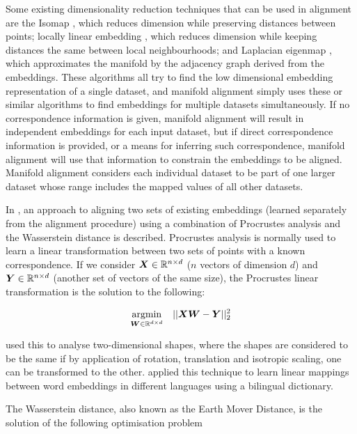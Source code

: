 Some existing dimensionality reduction techniques that can be used in alignment are the Isomap \cite{Isomap}, which reduces dimension while preserving distances between points; locally linear embedding \cite {LocallyLinearEmbedding}, which reduces dimension while keeping distances the same between local neighbourhoods; and Laplacian eigenmap \cite{LaplacianEigenmaps}, which approximates the manifold by the adjacency graph derived from the embeddings. These algorithms all try to find the low dimensional embedding representation of a single dataset, and manifold alignment simply uses these or similar algorithms to find embeddings for multiple datasets simultaneously. If no correspondence information is given, manifold alignment will result in independent embeddings for each input dataset, but if direct correspondence information is provided, or a means for inferring such correspondence, manifold alignment will use that information to constrain the embeddings to be aligned. Manifold alignment considers each individual dataset to be part of one larger dataset whose range includes the mapped values of all other datasets. 

In \cite{UnsupervisedAlignmentWP}, an approach to aligning two sets of existing embeddings (learned separately from the alignment procedure) using a combination of Procrustes analysis and the Wasserstein distance is described. Procrustes analysis is normally used to learn a linear transformation between two sets of points with a known correspondence. If we consider $\boldsymbol{X} \in \mathbb{R}^{n \times d}$ ($n$ vectors of dimension $d$) and $\boldsymbol{Y} \in \mathbb{R}^{n \times d}$ (another set of vectors of the same size), the Procrustes linear transformation is the solution to the following:

\begin{equation}
    \underset{\boldsymbol{W} \in \mathbb{R}^{d \times d}}{\operatorname{argmin}} \quad  ||\boldsymbol{X} \boldsymbol{W} - \boldsymbol{Y}||_2^2
\end{equation}

\cite{Goodall1991ProcrustesMI} used this to analyse two-dimensional shapes, where the shapes are considered to be the same if by application of rotation, translation and isotropic scaling, one can be transformed to the other. \cite{MikolovMachineTranslation} applied this technique to learn linear mappings between word embeddings in different languages using a bilingual dictionary. 

The Wasserstein distance, also known as the Earth Mover Distance, is the solution of the following optimisation problem

